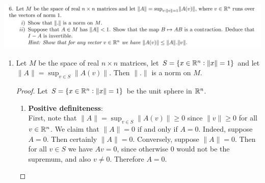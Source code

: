 \documentclass[12pt]{article}
\begin{document}
\newpage
\begin{mdframed}
  \includegraphics[width=400pt]{img/oxford-a2-2-6.png}
\end{mdframed}
\begin{enumerate}[label=(\roman*)]
\item
  \begin{claim*}
    Let $M$ be the space of real $n \times n$ matrices, let $S = \{x \in \mathbb{R}^n : \|x\| = 1\}$ and
    let $\|A\| = \sup_{v \in S} \|A(v)\|$. Then $\|.\|$ is a norm on $M$.
  \end{claim*}

  \begin{proof}
    Let $S = \{x \in \mathbb{R}^n : \|x\| = 1\}$ be the unit sphere in $\mathbb{R}^n$.
    \begin{enumerate}
    \item {\bf Positive definiteness}:\\
      First, note that $\|A\| = \sup_{v \in S} \|A(v)\| \geq 0$ since $\|v\| \geq 0$ for all
      $v \in \mathbb{R}^n$. We claim that $\|A\| = 0$ if and only if $A = 0$. Indeed, suppose $A = 0$. Then
      certainly $\|A\| = 0$. Conversely, suppose $\|A\| = 0$. Then for all $v \in S$ we have
      $Av = 0$, since otherwise $0$ would not be the supremum, and also $v \neq 0$. Therefore
      $A = 0$.



\end{enumerate}
\end{proof}
\end{enumerate}
\end{document}
